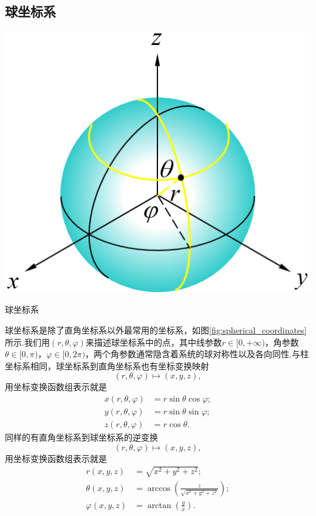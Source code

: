 	\subsection{球坐标系}
			
		\begin{marginfigure}
			\centering
			\includegraphics[width=1\textwidth]{figures/spherical_coordinates.png}
			\caption{球坐标系}\label{fig:spherical_coordinates}
		\end{marginfigure}
		球坐标系是除了直角坐标系以外最常用的坐标系，如图\ref{fig:spherical_coordinates}所示.我们用$(r,\theta,\varphi)$来描述球坐标系中的点，其中线参数$r\in[0,+\infty)$，角参数$\theta\in[0,\pi)$，$\varphi\in[0,2\pi)$，两个角参数通常隐含着系统的球对称性以及各向同性.与柱坐标系相同，球坐标系到直角坐标系也有坐标变换映射
		\begin{equation}\label{eq:rthetaphi to xyz 1}
			(r,\theta,\varphi)\mapsto(x,y,z),
		\end{equation}
		用坐标变换函数组表示就是
		\begin{equation}\label{eq:rthetaphi to xyz 2}
			\begin{split}
				x(r,\theta,\varphi)&=r\sin\theta \cos\varphi;\\
				y(r,\theta,\varphi)&=r\sin\theta \sin\varphi;\\
				z(r,\theta,\varphi)&=r\cos\theta.
			\end{split}
		\end{equation}
		同样的有直角坐标系到球坐标系的逆变换
		\begin{equation}\label{eq:xyz to rthetaphi 1}
			(r,\theta,\varphi)\mapsto(x,y,z),
		\end{equation}
		用坐标变换函数组表示就是
		\begin{equation}\label{eq:xyz to rthetaphi 2}
			\begin{split}
				r(x,y,z)&=\sqrt{x^2+y^2+z^2};\\
				\theta(x,y,z)&=\arccos\left(\frac{z}{\sqrt{x^2+y^2+z^2}}\right);\\
				\varphi(x,y,z)&=\arctan(\frac{y}{x}).
			\end{split}
		\end{equation}

